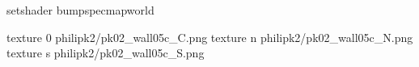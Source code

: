 setshader bumpspecmapworld

texture 0 philipk2/pk02_wall05c_C.png
texture n philipk2/pk02_wall05c_N.png
texture s philipk2/pk02_wall05c_S.png

